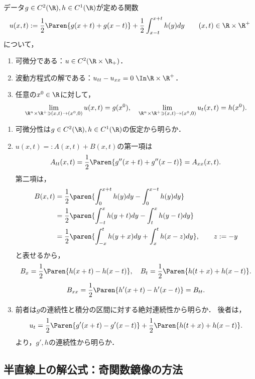 \documentclass[uplatex,dvipdfmx]{jsreport}
\begin{document}
\begin{theorem}
    データ$g\in C^2(\R),h\in C^1(\R)$が定める関数
    \[u(x,t):=\frac{1}{2}\Paren{g(x+t)+g(x-t)}+\frac{1}{2}\int^{x+t}_{x-t}h(y)dy\qquad(x,t)\in\R\times\R^+\]
    について，
    \begin{enumerate}
        \item 可微分である：$u\in C^2(\R\times\R_+)$．
        \item 波動方程式の解である：$u_{tt}-u_{xx}=0\;\In\R\times\R^+$．
        \item 任意の$x^0\in\R$に対して，
        \[\lim_{\R^n\times\R^+\ni(x,t)\to (x^0,0)}u(x,t)=g(x^0),\quad\lim_{\R^n\times\R^+\ni(x,t)\to (x^0,0)}u_t(x,t)=h(x^0).\]
    \end{enumerate}
\end{theorem}
\begin{Proof}\mbox{}
    \begin{enumerate}
        \item 可微分性は$g\in C^2(\R),h\in C^1(\R)$の仮定から明らか．
        \item $u(x,t)=:A(x,t)+B(x,t)$の第一項は
        \[A_{tt}(x,t)=\frac{1}{2}\Paren{g''(x+t)+g''(x-t)}=A_{xx}(x,t).\]
        第二項は，
        \begin{align*}
            B(x,t)&=\frac{1}{2}\paren{\int^{x+t}_0h(y)dy-\int^{x-t}_{0}h(y)dy}\\
            &=\frac{1}{2}\paren{\int^{x}_{-t}h(y+t)dy-\int^{x}_th(y-t)dy}\\
            &=\frac{1}{2}\paren{\int^t_{-x}h(y+x)dy+\int^{t}_{x}h(x-z)dy},\qquad z:=-y
        \end{align*}
        と表せるから，
        \[B_x=\frac{1}{2}\Paren{h(x+t)-h(x-t)},\quad B_t=\frac{1}{2}\Paren{h(t+x)+h(x-t)}.\]
        \[B_{xx}=\frac{1}{2}\Paren{h'(x+t)-h'(x-t)}=B_{tt}.\]
        \item 前者は$g$の連続性と積分の区間に対する絶対連続性から明らか．
        後者は，
        \[u_t=\frac{1}{2}\Paren{g'(x+t)-g'(x-t)}+\frac{1}{2}\Paren{h(t+x)+h(x-t)}.\]
        より，$g',h$の連続性から明らか．
    \end{enumerate}
\end{Proof}

\subsection{半直線上の解公式：奇関数鏡像の方法}
\end{document}
